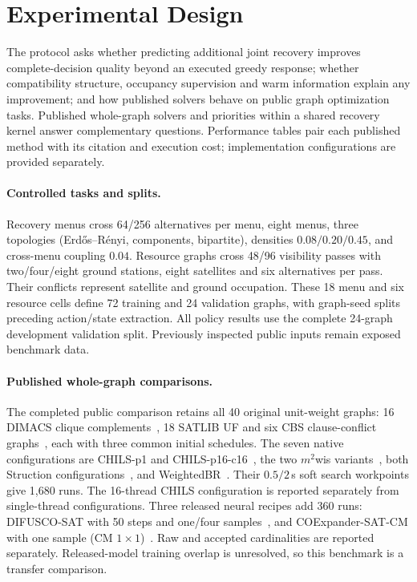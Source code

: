\section{Experimental Design}
\label{sec:experiments}

The protocol asks whether predicting additional joint recovery improves
complete-decision quality beyond an executed greedy response; whether
compatibility structure, occupancy supervision and warm information explain
any improvement; and how published solvers behave on public graph
optimization tasks. Published whole-graph
solvers and priorities within a shared recovery kernel answer complementary
questions. Performance tables pair each published method with its citation
and execution cost; implementation configurations are provided separately.

\paragraph{Controlled tasks and splits.}
Recovery menus cross 64/256 alternatives per menu, eight menus, three
topologies (Erd\H{o}s--R\'enyi, components, bipartite), densities
$0.08/0.20/0.45$, and cross-menu coupling $0.04$. Resource graphs cross
48/96 visibility passes with two/four/eight ground stations, eight
satellites and six alternatives per pass. Their conflicts represent
satellite and ground occupation. These 18 menu and six resource cells
define 72 training and 24 validation graphs, with graph-seed splits preceding
action/state extraction. All policy results use the complete 24-graph
development validation split. Previously inspected public inputs remain
exposed benchmark data.

\paragraph{Published whole-graph comparisons.}
The completed public comparison retains all 40 original unit-weight graphs:
16 DIMACS clique complements~\cite{johnson1996dimacs}, 18 SATLIB UF and six
CBS clause-conflict graphs~\cite{hoos2000satlib}, each with three common
initial schedules. The seven native configurations are CHILS-p1 and
CHILS-p16-c16~\cite{grossmann2025chils}, the two
$m^2$wis variants~\cite{grossmann2024mwis}, both Struction
configurations~\cite{gellner2021struction}, and
WeightedBR~\cite{lamm2019exact}. Their $0.5/2$\,s soft search workpoints
give 1,680 runs. The 16-thread CHILS configuration is reported separately
from single-thread configurations. Three released neural recipes add 360
runs: DIFUSCO-SAT with 50 steps and one/four
samples~\cite{sun2023difusco}, and COExpander-SAT-CM with one
sample (CM $1\times1$)~\cite{ma2025coexpander}. Raw and accepted cardinalities
are reported separately. Released-model
training overlap is unresolved, so this benchmark is a transfer comparison.

